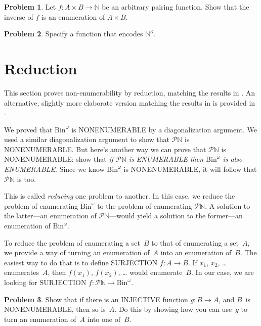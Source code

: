 \documentclass[10pt,a4paper]{article}
\makeatletter
\newcommand*{\olup}[1]{\MakeUppercase{#1}}
\theoremstyle{plain}
\theoremstyle{definition}
\newtheorem{prob}{Problem}[section]
\theoremstyle{remark}
\newenvironment{editorial}{}{}
\newcommand*{\olfileid}[3]{}
\newcommand*{\olsection}[1]{\section*{#1}}
\newcommand{\olref}{\@ifnextchar[{\olref@i}{\olref@final}}
\def\olref@i[#1]{\@ifnextchar[{\olref@ii}{\olref@final}}
\def\olref@ii[#1]{\@ifnextchar[{\olref@iii}{\olref@final}}
\def\olref@iii[#1]{\olref@final}
\def\olref@final#1{\ref{#1}}
\providecommand{\Nat}{\ensuremath{\mathbb{N}}}
\providecommand{\Bin}{\mathrm{Bin}}
\providecommand{\Pow}{\mathcal{P}}
\makeatother
\begin{document}
\begin{prob}
Let $f \colon A \times B \to \Nat$ be an arbitrary pairing function.
Show that the inverse of $f$ is an enumeration of $A \times B$.
\end{prob}

\begin{prob}
Specify a function that encodes $\Nat^3$.
\end{prob}





\olfileid{sfr}{siz}{red-alt}

\olsection{Reduction}

\begin{editorial}
  This section proves non-enumerability by reduction, matching the
  results in \olref[nen-alt]{sec}. An alternative, slightly more
  elaborate version matching the results in \olref[nen]{sec} is
  provided in \olref[red]{sec}.
\end{editorial}

We proved that $\Bin^\omega$ is \olup{nonenumerable} by a diagonalization
argument. We used a similar diagonalization argument to show that
$\Pow{\Nat}$ is \olup{nonenumerable}. But here's another way we can prove
that $\Pow{\Nat}$ is \olup{nonenumerable}: show that \emph{if
$\Pow{\Nat}$ is \olup{enumerable} then $\Bin^\omega$ is also
\olup{enumerable}}.  Since we know $\Bin^\omega$ is \olup{nonenumerable}, it
will follow that $\Pow{\Nat}$ is too.  

This is called \emph{reducing} one problem to another. In this case,
we reduce the problem of enumerating $\Bin^\omega$ to the problem of
enumerating $\Pow{\Nat}$.  A solution to the latter---an enumeration
of $\Pow{\Nat}$---would yield a solution to the former---an
enumeration of $\Bin^\omega$.

To reduce the problem of enumerating a set~$B$ to that of enumerating
a set~$A$, we provide a way of turning an enumeration of~$A$ into an
enumeration of~$B$.  The easiest way to do that is to define
\olup{surjection} $f\colon A \to B$.  If $x_1$, $x_2$, \dots{}
enumerates~$A$, then $f(x_1)$, $f(x_2)$, \dots{} would enumerate~$B$.
In our case, we are looking for \olup{surjection} $f\colon \Pow{\Nat}
\to \Bin^\omega$.

\begin{prob}
Show that if there is an \olup{injective} function $g\colon B \to A$, and
$B$~is \olup{nonenumerable}, then so is~$A$. Do this by showing how you
can use~$g$ to turn an enumeration of~$A$ into one of~$B$.
\end{prob}
\end{document}
